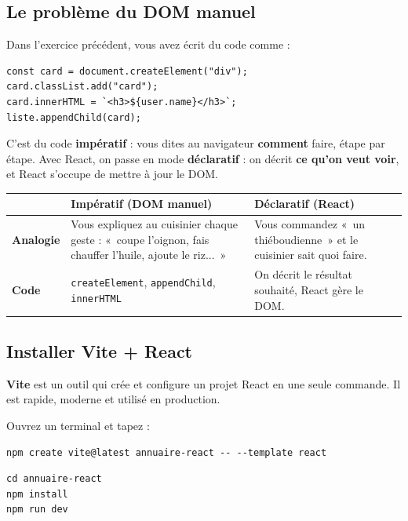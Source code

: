 \documentclass[11pt,a4paper]{article}
\begin{document}
\subsection{Le problème du DOM manuel}

Dans l'exercice précédent, vous avez écrit du code comme :

\begin{lstlisting}
const card = document.createElement("div");
card.classList.add("card");
card.innerHTML = `<h3>${user.name}</h3>`;
liste.appendChild(card);
\end{lstlisting}

C'est du code \textbf{impératif} : vous dites au navigateur \textbf{comment} faire, étape par étape. Avec React, on passe en mode \textbf{déclaratif} : on décrit \textbf{ce qu'on veut voir}, et React s'occupe de mettre à jour le DOM.

\begin{retenirbox}
\begin{center}
\begin{tabular}{lp{5cm}p{5cm}}
\toprule
& \textbf{Impératif} (DOM manuel) & \textbf{Déclaratif} (React) \\
\midrule
\textbf{Analogie} & Vous expliquez au cuisinier chaque geste : «~coupe l'oignon, fais chauffer l'huile, ajoute le riz...~» & Vous commandez «~un thiéboudienne~» et le cuisinier sait quoi faire. \\
\textbf{Code} & \texttt{createElement}, \texttt{appendChild}, \texttt{innerHTML} & On décrit le résultat souhaité, React gère le DOM. \\
\bottomrule
\end{tabular}
\end{center}
\end{retenirbox}

\subsection{Installer Vite + React}

\textbf{Vite} est un outil qui crée et configure un projet React en une seule commande. Il est rapide, moderne et utilisé en production.

Ouvrez un terminal et tapez :

\begin{lstlisting}[style=terminal]
npm create vite@latest annuaire-react -- --template react
\end{lstlisting}

\begin{lstlisting}[style=terminal]
cd annuaire-react
npm install
npm run dev
\end{lstlisting}
\end{document}
